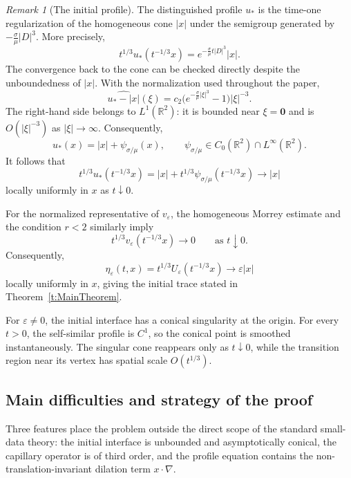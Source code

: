 \documentclass[12pt]{amsart}
\theoremstyle{remark}
\newtheorem{remark}{Remark}[section]
\theoremstyle{definition}
\numberwithin{equation}{section}
\newcommand{\R}{\mathbb{R}}
\begin{document}
\begin{remark}[The initial profile]
\label{rem:initial-profile}
The distinguished profile \(u_*\) is the time-one regularization of the homogeneous cone \(|x|\) under the semigroup generated by \(-\frac{\sigma}{\mu}|D|^3\).
More precisely,
\[
 t^{1/3}u_*(t^{-1/3}x) = e^{-\frac{\sigma}{\mu}t|D|^3}|x|.
\]
The convergence back to the cone can be checked directly despite the
unboundedness of \(|x|\).
With the normalization used throughout the paper,
\[
 \widehat{u_*-|x|}(\xi) = c_2 \bigl( e^{-\frac{\sigma}{\mu}|\xi|^3}-1 \bigr)|\xi|^{-3}.
\]
The right-hand side belongs to \(L^1(\R^2)\): it is bounded near \(\xi = \mathbf{0}\) and is \(O(|\xi|^{-3})\) as \(|\xi|\to\infty\).
Consequently,
\[
 u_*(x) = |x|+\psi_{\sigma/\mu}(x), \qquad \psi_{\sigma/\mu}\in C_0(\R^2)\cap L^\infty(\R^2).
\]
It follows that
\[
 t^{1/3}u_*(t^{-1/3}x) = |x|+t^{1/3}\psi_{\sigma/\mu}(t^{-1/3}x) \longrightarrow |x|
\]
locally uniformly in \(x\) as \(t\downarrow0\).

For the normalized representative of \(v_\varepsilon\), the homogeneous
Morrey estimate and the condition \(r<2\) similarly imply
\[
 t^{1/3}v_\varepsilon(t^{-1/3}x) \longrightarrow0 \qquad \text{as }t\downarrow0.
\]
Consequently,
\[
 \eta_\varepsilon(t,x) = t^{1/3} U_\varepsilon(t^{-1/3}x) \longrightarrow \varepsilon|x|
\]
locally uniformly in \(x\), giving the initial trace stated in Theorem~\ref{t:MainTheorem}.

For \(\varepsilon\neq0\), the initial interface has a conical singularity at the origin.
For every \(t>0\), the self-similar profile is \(C^1\), so the conical point is smoothed instantaneously.
The singular cone reappears only as \(t\downarrow0\), while the transition region near its vertex has spatial scale \(O(t^{1/3})\).
\end{remark}

\subsection{Main difficulties and strategy of the proof}
\label{s:main-difficulties-strategy}

Three features place the problem outside the direct scope of the standard small-data theory: 
the initial interface is unbounded and asymptotically conical, the capillary operator is of third order, and the profile equation contains the non-translation-invariant dilation term \(x\cdot\nabla\).
\end{document}

